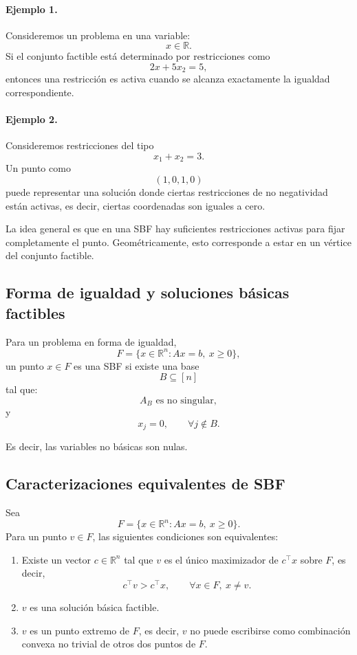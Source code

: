 \paragraph{Ejemplo 1.}
Consideremos un problema en una variable:
\[
    x\in\mathbb{R}.
\]
Si el conjunto factible está determinado por restricciones como
\[
    2x+5x_2=5,
\]
entonces una restricción es activa cuando se alcanza exactamente la igualdad correspondiente.

\paragraph{Ejemplo 2.}
Consideremos restricciones del tipo
\[
    x_1+x_2=3.
\]
Un punto como
\[
    (1,0,1,0)
\]
puede representar una solución donde ciertas restricciones de no negatividad están activas, es decir, ciertas coordenadas son iguales a cero.

\begin{remark}
La idea general es que en una SBF hay suficientes restricciones activas para fijar completamente el punto. Geométricamente, esto corresponde a estar en un vértice del conjunto factible.
\end{remark}

\subsection{Forma de igualdad y soluciones básicas factibles}

Para un problema en forma de igualdad,
\[
    F=
    \{x\in\mathbb{R}^n:Ax=b,\ x\geq 0\},
\]
un punto \(x\in F\) es una SBF si existe una base
\[
    B\subseteq[n]
\]
tal que:
\[
    A_B \text{ es no singular},
\]
y
\[
    x_j=0,
    \qquad
    \forall j\notin B.
\]

Es decir, las variables no básicas son nulas.

\subsection{Caracterizaciones equivalentes de SBF}

\begin{theorem}
Sea
\[
    F=
    \{x\in\mathbb{R}^n:Ax=b,\ x\geq 0\}.
\]
Para un punto \(v\in F\), las siguientes condiciones son equivalentes:

\begin{enumerate}
    \item Existe un vector \(c\in\mathbb{R}^n\) tal que \(v\) es el único maximizador de \(c^\top x\) sobre \(F\), es decir,
    \[
        c^\top v>c^\top x,
        \qquad
        \forall x\in F,\ x\neq v.
    \]

    \item \(v\) es una solución básica factible.

    \item \(v\) es un punto extremo de \(F\), es decir, \(v\) no puede escribirse como combinación convexa no trivial de otros dos puntos de \(F\).
\end{enumerate}
\end{theorem}

